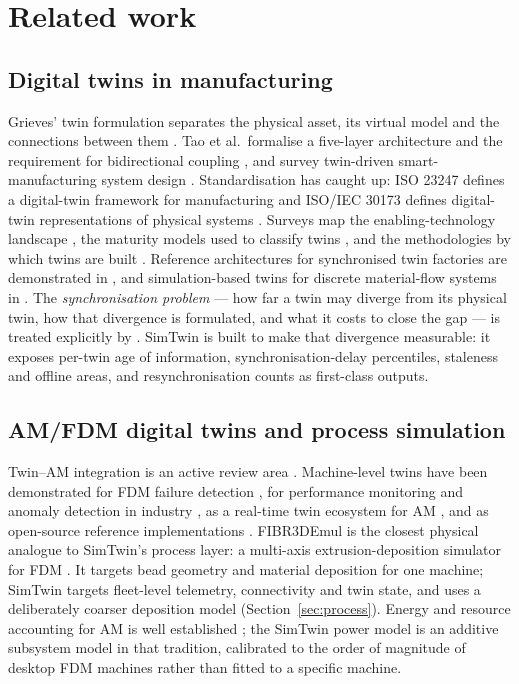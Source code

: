 \documentclass[preprint,12pt,authoryear,nopreprintline]{elsarticle}
\newcommand{\smt}{SimTwin}
\begin{document}
\section{Related work}
\label{sec:related}

\subsection{Digital twins in manufacturing}
Grieves' twin formulation separates the physical asset, its virtual model and the
connections between them \citep{grieves2014dt,grieves2016dt}.
Tao et al.\ formalise a five-layer architecture and the requirement for
bidirectional coupling \citep{tao2019dtii,tao2017fivelayer}, and survey
twin-driven smart-manufacturing system design \citep{liu2023dtms}.
Standardisation has caught up: ISO 23247 defines a digital-twin framework for
manufacturing \citep{iso23247} and ISO/IEC 30173 defines digital-twin
representations of physical systems \citep{iso30173}.
Surveys map the enabling-technology landscape \citep{fuller2020dt,barricelli2019dt},
the maturity models used to classify twins \citep{uhlenkamp2022maturity}, and the
methodologies by which twins are built \citep{aznar2026dtm}.
Reference architectures for synchronised twin factories are demonstrated in
\citep{kumar2024dtfactory}, and simulation-based twins for discrete material-flow
systems in \citep{schwede2024sbdm}.
The \emph{synchronisation problem} --- how far a twin may diverge from its
physical twin, how that divergence is formulated, and what it costs to close the
gap --- is treated explicitly by \citet{tan2023sync}.
\smt{} is built to make that divergence measurable: it exposes per-twin age of
information, synchronisation-delay percentiles, staleness and offline areas, and
resynchronisation counts as first-class outputs.

\subsection{AM/FDM digital twins and process simulation}
Twin--AM integration is an active review area \citep{jyeniskhan2024amdt}.
Machine-level twins have been demonstrated for FDM failure detection
\citep{henson2021dt}, for performance monitoring and anomaly detection in
industry \citep{mtdn2024}, as a real-time twin ecosystem for AM
\citep{pantelidakis2022dt}, and as open-source reference implementations
\citep{robles2023opentwins,infante2025opentwins,larsen2024recast}.
FIBR3DEmul is the closest physical analogue to \smt{}'s process layer: a
multi-axis extrusion-deposition simulator for FDM \citep{fibremul2020}.
It targets bead geometry and material deposition for one machine; \smt{} targets
fleet-level telemetry, connectivity and twin state, and uses a deliberately
coarser deposition model (Section~\ref{sec:process}).
Energy and resource accounting for AM is well established
\citep{baumers2017jiec,wippermann2020jcp}; the \smt{} power model
is an additive subsystem model in that tradition, calibrated to the order of
magnitude of desktop FDM machines rather than fitted to a specific machine.
\end{document}
